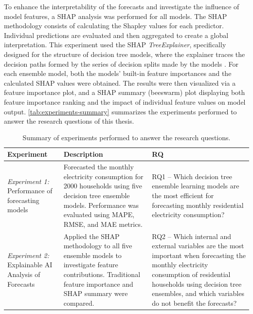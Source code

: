 To enhance the interpretability of the forecasts and investigate the influence of model features, a SHAP analysis was performed for all models. The SHAP methodology consists of calculating the Shapley values for each predictor. Individual predictions are evaluated and then aggregated to create a global interpretation. This experiment used the SHAP \emph{TreeExplainer}, specifically designed for the structure of decision tree models, where the explainer traces the decision paths formed by the series of decision splits made by the models \cite{mitchell_gputreeshap_2022}. For each ensemble model, both the models' built-in feature importances and the calculated SHAP values were obtained. The results were then visualized via a feature importance plot, and a SHAP summary (beeswarm) plot displaying both feature importance ranking and the impact of individual feature values on model output. \autoref{tab:experiments-summary} summarizes the experiments performed to answer the research questions of this thesis.

\begin{table}[h!tbp]%
    \centering
    \caption{Summary of experiments performed to answer the research questions.}
    \label{tab:experiments-summary}
    \small
    \begin{tabularx}{\linewidth}{Q{3cm} Q{4.5cm} L}
        \textbf{Experiment}                                       & \textbf{Description}                                                                                                                                                      & \textbf{RQ}                                                                                                                            \\
        \midrule
        \emph{Experiment 1:} Performance of forecasting models    & Forecasted the monthly electricity consumption for 2000 households using five decision tree ensemble models. Performance was evaluated using MAPE, RMSE, and MAE metrics. & RQ1 – Which decision tree ensemble learning models are the most efficient for forecasting monthly residential electricity consumption? \\

        \midrule

        \emph{Experiment 2:} Explainable AI Analysis of Forecasts & Applied the SHAP methodology to all five ensemble models to investigate feature contributions. Traditional feature importance and SHAP summary were compared.             & RQ2 – Which internal and external variables are the most important when forecasting the
        monthly electricity consumption of residential households using decision tree ensembles,
        and which variables do not benefit the forecasts?
    \end{tabularx}
\end{table}

